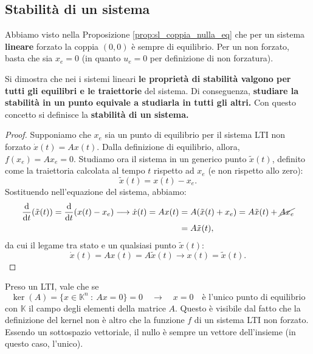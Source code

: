 \documentclass[a4paper]{report}
\begin{document}
\subsection{Stabilità di un sistema}
\begin{prop}
Abbiamo visto nella Proposizione \eqref{prop:sl_coppia_nulla_eq} che per un sistema \textbf{lineare} forzato la coppia $(0,0)$ è sempre di equilibrio. Per un non forzato, basta che sia $x_e = 0$ (in quanto $u_e = 0$ per definizione di non forzatura).
\end{prop}
\begin{prop}
	Si dimostra che nei i sistemi lineari \textbf{le proprietà di stabilità valgono per tutti gli equilibri e le traiettorie} del sistema. Di conseguenza, \textbf{studiare la stabilità in un punto equivale a studiarla in tutti gli altri.} Con questo concetto si definisce la \textbf{stabilità di un sistema.}
\end{prop}
\begin{proof}
	Supponiamo che $x_e$ sia un punto di equilibrio per il sistema LTI non forzato $\dot x(t) = Ax(t).$ Dalla definizione di equilibrio, allora, $f(x_e) = Ax_e = 0$. Studiamo ora il sistema in un generico punto $\tilde x(t)$, definito come la traiettoria calcolata al tempo $t$ rispetto ad $x_e$ (e non rispetto allo zero): 
\begin{equation*}
		\tilde x(t) = x(t) - x_e.
	\end{equation*}
	Sostituendo nell'equazione del sistema, abbiamo:
\begin{align*}
	\dv{t}(\tilde x(t)) = \dv{t}(x(t)-x_e) \longrightarrow \dot x(t) = Ax(t) & =A(\tilde x(t) + x_e)  = A\tilde x(t)+ \cancel{Ax_e} \\ & = A\tilde x(t),
	\end{align*}
	da cui il legame tra stato e un qualsiasi punto $\tilde x(t)$:
\begin{equation*}
	\dot x(t) = Ax(t) = A \tilde x(t) \longrightarrow x(t) = \tilde x(t).
\end{equation*}
\end{proof}
\begin{prop}
Preso un LTI, vale che se $$\ker (A) = \{ x \in \mathbb{K}^n \ : \ Ax = 0 \}= 0 \quad \rightarrow \quad x=0 \quad \textrm{è l'unico punto di equilibrio}$$ con $\mathbb{K}$ il campo degli elementi della matrice $A$. Questo è visibile dal fatto che la definizione del kernel non è altro che la funzione $f$ di un sistema LTI non forzato. Essendo un sottospazio vettoriale, il nullo è sempre un vettore dell'insieme (in questo caso, l'unico).\end{prop}
\end{document}
